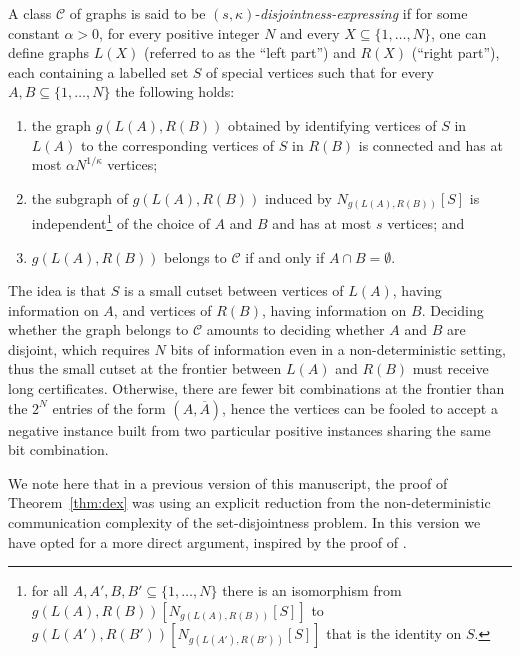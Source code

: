 \documentclass[a4paper,reqno, 12pt]{amsart}
\newcommand{\formerepsilon}{\kappa}
\begin{document}
A class $\mathcal{C}$ of graphs is said to be
$(s, \formerepsilon)$-\emph{disjointness-expressing}
if for some constant ${\alpha>0}$, for every positive integer
$N$ and every $X \subseteq \{1,\ldots, N\}$, one can define graphs
$L(X)$ (referred to as the ``left part'') and $R(X)$ (``right part''), each containing a labelled
set $S$ of special vertices 
such that for every $A,B\subseteq \{1,\ldots, N\}$ the following holds:

\begin{enumerate}[label=(\roman*)]
\item\label{item:total-size} the graph $g(L(A),R(B))$ obtained by identifying vertices of $S$
  in $L(A)$ to the corresponding vertices of $S$ in $R(B)$ is
  connected and has at most $\alpha N^{1/\formerepsilon}$ vertices;
\item\label{item:indep-size} the subgraph of $g(L(A), R(B))$ induced by 
  $N_{g(L(A), R(B))}[S]$ %
  is independent\footnote{for all
    $A,A',B,B'\subseteq \{1, \ldots, N\}$ there is an isomorphism from
    $g(L(A),R(B))[N_{g(L(A), R(B))}[S]]$ to
    $g(L(A'),R(B'))[N_{g(L(A'), R(B'))}[S]]$ that is the identity on $S$.} of
  the choice of $A$ and $B$ and has at most $s$ vertices; and
\item\label{item:no-intersection} $g(L(A),R(B))$ belongs to $\mathcal{C}$ if and only if $A\cap
  B=\emptyset$.
\end{enumerate}

The idea is that $S$ is a small cutset between vertices of $L(A)$, having information on $A$, and vertices of $R(B)$, having information on $B$. Deciding whether the graph belongs to $\mathcal{C}$ amounts to deciding whether $A$ and $B$ are disjoint, which requires $N$ bits of information even in a non-deterministic setting, thus the small cutset at the frontier between $L(A)$ and $R(B)$ must receive long certificates. Otherwise,
there are fewer bit combinations at the frontier than the $2^N$ entries of the form $(A, \overline{A})$, hence the vertices can be fooled to accept a negative
instance built from two particular positive instances sharing the same bit combination. 



We note here that in a previous version of this manuscript, the proof
of Theorem~\ref{thm:dex} was 
using an explicit reduction from the non-deterministic communication complexity
of the set-disjointness problem. In this version we have opted for a
more direct argument, inspired by the proof of \cite[Theorem
6.4]{lcp}.
\end{document}
